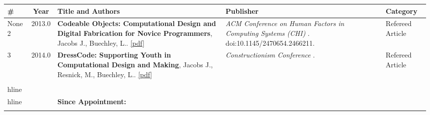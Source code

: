 
\begin{longtable}{lcp{7.75cm}>{\raggedright}p{5.25cm}p{1.75cm}}
\# & Year & Title and Authors & Publisher & Category\\
\hline 
\endhead 
    None
    2 & 2013.0 & {\bf Codeable Objects: Computational Design and Digital Fabrication for Novice Programmers}, Jacobs J., Buechley, L.. \href{nan}{[pdf]} & \emph{ ACM Conference on Human Factors in Computing Systems (CHI) } . doi:10.1145/2470654.2466211.  & Refereed Article\\
    3 & 2014.0 & {\bf DressCode: Supporting Youth in Computational Design and Making}, Jacobs J., Resnick, M., Buechley, L.. \href{nan}{[pdf]} & \emph{ Constructionism Conference  } .   & Refereed Article\\
\\hline
\\hline
   &   & {\bf Since Appointment:} &    &   \\\\
\end{longtable}
